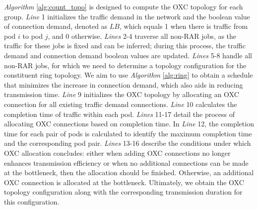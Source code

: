 \documentclass[conference]{IEEEtran}
\begin{document}

\emph{Algorithm} \ref{alg:count_topo} is designed to compute the OXC topology for each group. \emph{Line} 1 initializes the traffic demand in the network and the boolean value of connection demand, denoted as $LB$, which equals 1 when there is traffic from pod \(i\) to pod \(j\), and 0 otherwise. \emph{Lines} 2-4 traverse all non-RAR jobs, as the traffic for these jobs is fixed and can be inferred; during this process, the traffic demand and connection demand boolean values are updated. \emph{Lines} 5-8 handle all non-RAR jobs, for which we need to determine a topology configuration for the constituent ring topology. We aim to use \emph{Algorithm} \ref{alg:ring} to obtain a schedule that minimizes the increase in connection demand, which also aids in reducing transmission time. \emph{Line} 9 initializes the OXC topology by allocating an OXC connection for all existing traffic demand connections. \emph{Line} 10 calculates the completion time of traffic within each pod. \emph{Lines} 11-17 detail the process of allocating OXC connections based on completion time. In \emph{Line} 12, the completion time for each pair of pods is calculated to identify the maximum completion time and the corresponding pod pair. \emph{Lines} 13-16 describe the conditions under which OXC allocation concludes: either when adding OXC connections no longer enhances transmission efficiency or when no additional connections can be made at the bottleneck, then the allocation should be finished. Otherwise, an additional OXC connection is allocated at the bottleneck. Ultimately, we obtain the OXC topology configuration along with the corresponding transmission duration for this configuration.
\end{document}
